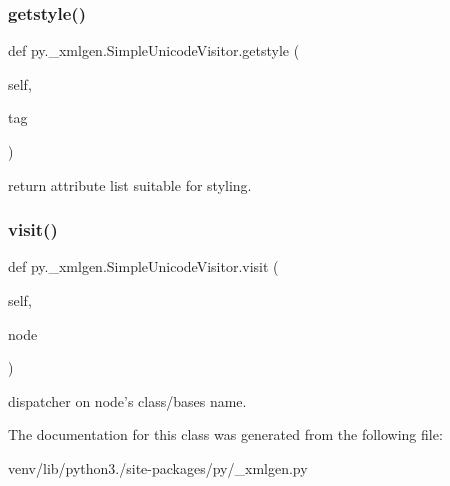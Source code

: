 \subsubsection{\texorpdfstring{getstyle()}{getstyle()}}
{\footnotesize\ttfamily def py.\+\_\+xmlgen.\+Simple\+Unicode\+Visitor.\+getstyle (\begin{DoxyParamCaption}\item[{}]{self,  }\item[{}]{tag }\end{DoxyParamCaption})}

\begin{DoxyVerb}return attribute list suitable for styling. \end{DoxyVerb}
 \mbox{\label{classpy_1_1__xmlgen_1_1_simple_unicode_visitor_af46e97d5b1f5bf6ac778786734eeca67}} 
\subsubsection{\texorpdfstring{visit()}{visit()}}
{\footnotesize\ttfamily def py.\+\_\+xmlgen.\+Simple\+Unicode\+Visitor.\+visit (\begin{DoxyParamCaption}\item[{}]{self,  }\item[{}]{node }\end{DoxyParamCaption})}

\begin{DoxyVerb}dispatcher on node's class/bases name. \end{DoxyVerb}
 

The documentation for this class was generated from the following file\+:\begin{DoxyCompactItemize}
\item 
venv/lib/python3./site-\/packages/py/\+\_\+xmlgen.\+py\end{DoxyCompactItemize}
